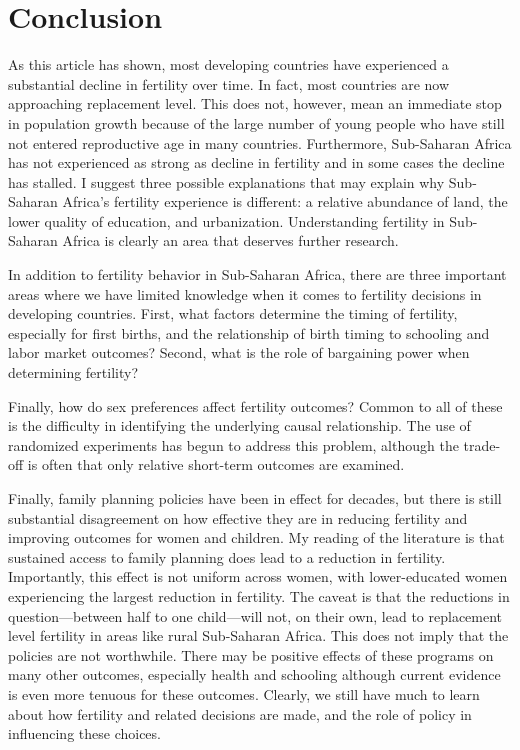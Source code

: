\documentclass[letterpaper,12pt]{article}
\begin{document}
\section{Conclusion}\label{conclusion}

As this article has shown, most developing countries have experienced a
substantial decline in fertility over time. 
In fact, most countries are now approaching replacement level. 
This does not, however, mean an immediate stop in population growth
because of the large number of young people who have still not entered
reproductive age in many countries. 
Furthermore, Sub-Saharan Africa has not experienced as strong as decline
in fertility and in some cases the decline has stalled. 
I suggest three possible explanations that may explain why Sub-Saharan
Africa's fertility experience is different: a relative abundance of
land, the lower quality of education, and urbanization. 
Understanding fertility in Sub-Saharan Africa is clearly an area that
deserves further research.

In addition to fertility behavior in Sub-Saharan Africa, there are three
important areas where we have limited knowledge when it comes to
fertility decisions in developing countries. 
First, what factors determine the timing of fertility, especially for
first births, and the relationship of birth timing to schooling and
labor market outcomes? 
Second, what is the role of bargaining power when determining fertility?

Finally, how do sex preferences affect fertility outcomes? 
Common to all of these is the difficulty in identifying the underlying
causal relationship. 
The use of randomized experiments has begun to address this problem,
although the trade-off is often that only relative short-term outcomes
are examined.

Finally, family planning policies have been in effect for decades, but
there is still substantial disagreement on how effective they are in
reducing fertility and improving outcomes for women and children. 
My reading of the literature is that sustained access to family planning
does lead to a reduction in fertility. 
Importantly, this effect is not uniform across women, with
lower-educated women experiencing the largest reduction in fertility. 
The caveat is that the reductions in question---between half to one
child---will not, on their own, lead to replacement level fertility in
areas like rural Sub-Saharan Africa. 
This does not imply that the policies are not worthwhile. 
There may be positive effects of these programs on many other outcomes,
especially health and schooling although current evidence is even more
tenuous for these outcomes. 
Clearly, we still have much to learn about how fertility and related
decisions are made, and the role of policy in influencing these choices.



\end{document}
